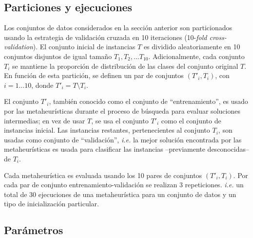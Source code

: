 \subsection{Particiones y ejecuciones}

Los conjuntos de datos considerados en la sección anterior son particionados usando la estrategia de validación cruzada en 10 iteraciones (10-\emph{fold cross-validation}). El conjunto inicial de instancias $T$ es dividido aleatoriamente en 10 conjuntos disjuntos de igual tamaño $T_1, T_2, \dots T_{10}$. Adicionalmente, cada conjunto $T_i$ se mantiene la proporción de distribución de las clases del conjunto original $T$. En función de esta partición, se definen un par de conjuntos $(T'_i, T_i)$, con $i = 1 \dots 10$, donde $T'_i = T \setminus T_i$.

El conjunto $T'_i$, también conocido como el conjunto de ``entrenamiento'', es usado por las metaheurísticas durante el proceso de búsqueda para evaluar soluciones intermedias; en vez de usar $T$, se usa el conjunto $T'_i$ como el conjunto de instancias inicial. Las instancias restantes, pertenecientes al conjunto $T_i$, son usadas como conjunto de ``validación'', \emph{i.e.} la mejor solución encontrada por las metaheurísticas es usada para clasificar las instancias --previamente desconocidas-- de $T_i$.

Cada metaheurística es evaluada usando los 10 pares de conjuntos $(T'_i, T_i)$. Por cada par de conjunto entrenamiento-validación se realizan 3 repeticiones. \emph{i.e.} un total de 30 ejecuciones de una metaheurística para un conjunto de datos y un tipo de inicialización particular.

\subsection{Parámetros}

\blindtext

